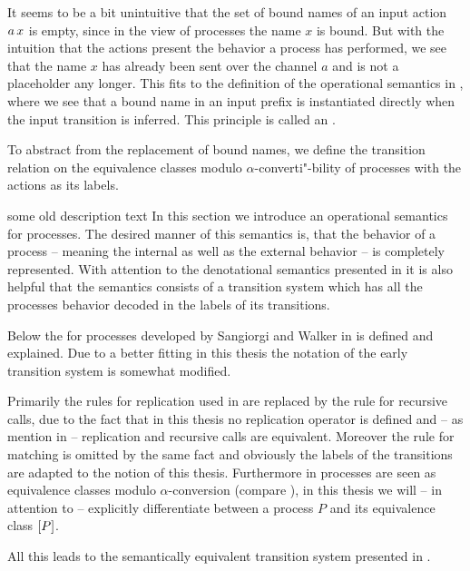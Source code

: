 It seems to be a bit unintuitive that the set of bound names of an input action $a\,x$ is empty, since in the view of processes the name $x$ is bound. But with the intuition that the actions present the behavior a process has performed, we see that the name $x$ has already been sent over the channel $a$ and is not a placeholder any longer. This fits to the definition of the operational semantics in , where we see that a bound name in an input prefix is instantiated directly when the input transition is inferred. This principle is called an .

To abstract from the replacement of bound names, we define the transition relation on the equivalence classes modulo $\alpha$-converti"-bility of processes with the actions as its labels.

\begin{old}{some old description text}
In this section we introduce an operational semantics for \picalc{} processes. The desired manner of this semantics is, that the behavior of a process -- meaning the internal as well as the external behavior -- is completely represented. With attention to the denotational semantics presented in  it is also helpful that the semantics consists of a transition system which has all the processes behavior decoded in the labels of its transitions.

Below the  for \picalc{} processes developed by Sangiorgi and Walker in \cite{sangiorgi} is defined and explained. Due to a better fitting in this thesis the notation of the early transition system is somewhat modified.

Primarily the rules for replication used in \cite{sangiorgi} are replaced by the rule for recursive calls, due to the fact that in this thesis no replication operator is defined and -- as mention in \cite{milner} -- replication and recursive calls are equivalent. Moreover the rule for matching is omitted by the same fact and obviously the labels of the transitions are adapted to the notion of this thesis. Furthermore in \cite{sangiorgi} processes are seen as equivalence classes modulo $\alpha$-conversion (compare ), in this thesis we will -- in attention to  -- explicitly differentiate between a process $P$ and its equivalence class $\left[P\right]$.

All this leads to the semantically equivalent transition system presented in .
\end{old}

